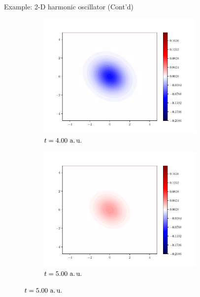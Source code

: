 \documentclass[12pt]{beamer}
\begin{document}
\begin{frame}{Example: 2-D harmonic oscillator (Cont'd)}
\begin{figure}
\begin{subfigure}[b]{0.4\textwidth}
                \includegraphics[width=0.9\textwidth]{functions-00003999.pdf}
                \caption*{$t = 4.00~\text{a.\,u.}$}
            \end{subfigure}
            \begin{subfigure}[b]{0.4\textwidth}
                \centering
                \includegraphics[width=0.9\textwidth]{functions-00004999.pdf}
                \caption*{$t = 5.00~\text{a.\,u.}$}
            \end{subfigure}
        \end{figure}
    \end{frame}
\end{document}

